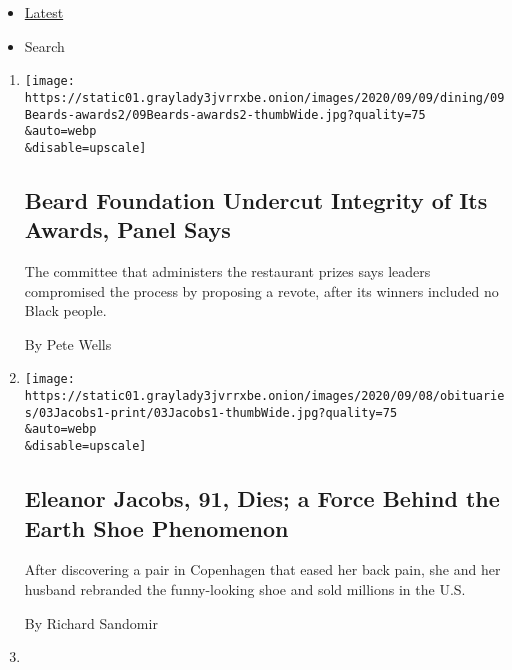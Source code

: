 \begin{itemize}
\tightlist
\item
  \protect\hyperlink{stream-panel}{Latest}
\item
  Search
\end{itemize}

\begin{enumerate}
\def\labelenumi{\arabic{enumi}.}
\item
  \href{/2020/09/09/dining/james-beard-awards.html}{}

  \texttt{[image: https://static01.graylady3jvrrxbe.onion/images/2020/09/09/dining/09Beards-awards2/09Beards-awards2-thumbWide.jpg?quality=75\\\&auto=webp\\\&disable=upscale]}

  \hypertarget{beard-foundation-undercut-integrity-of-its-awards-panel-says}{%
  \subsection{Beard Foundation Undercut Integrity of Its Awards, Panel
  Says}\label{beard-foundation-undercut-integrity-of-its-awards-panel-says}}

  The committee that administers the restaurant prizes says leaders
  compromised the process by proposing a revote, after its winners
  included no Black people.

  By Pete Wells
\item
  \href{/2020/09/05/fashion/eleanor-jacobs-91-dies-a-force-behind-the-earth-shoe-phenomenon.html}{}

  \texttt{[image: https://static01.graylady3jvrrxbe.onion/images/2020/09/08/obituaries/03Jacobs1-print/03Jacobs1-thumbWide.jpg?quality=75\\\&auto=webp\\\&disable=upscale]}

  \hypertarget{eleanor-jacobs-91-dies-a-force-behind-the-earth-shoe-phenomenon}{%
  \subsection{Eleanor Jacobs, 91, Dies; a Force Behind the Earth Shoe
  Phenomenon}\label{eleanor-jacobs-91-dies-a-force-behind-the-earth-shoe-phenomenon}}

  After discovering a pair in Copenhagen that eased her back pain, she
  and her husband rebranded the funny-looking shoe and sold millions in
  the U.S.

  By Richard Sandomir
\item
  \href{/2020/09/04/dining/lucky-palace-bossier-city-louisiana-restaurant.html}{}


\end{enumerate}
